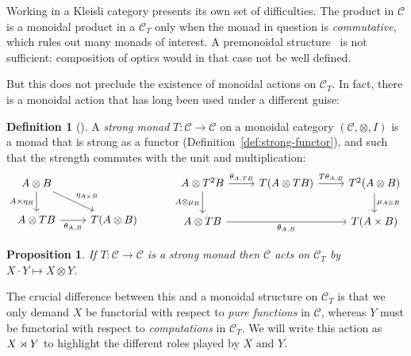 \documentclass[11pt,letterpaper]{article}
\theoremstyle{plain}
\newtheorem{proposition}[theorem]{Proposition}
\theoremstyle{definition}
\newtheorem{definition}[theorem]{Definition}
\newcommand{\C}{\mathscr{C}}
\begin{document}
Working in a Kleisli category presents its own set of difficulties. The product in $\C$ is a monoidal product in a $\C_T$ only when the monad in question is \emph{commutative}, which rules out many monads of interest. A premonoidal structure~\cite{PremonoidalCategories} is not sufficient: composition of optics would in that case not be well defined.

But this does not preclude the existence of monoidal actions on $\C_T$. In fact, there is a monoidal action that has long been used under a different guise:

\begin{definition}[{\cite{NotionsOfComputationAndMonads}}]
A \emph{strong monad} $T : \C \to \C$ on a monoidal category $(\C, \otimes, I)$ is a monad that is strong as a functor (Definition~\ref{def:strong-functor}), and such that the strength commutes with the unit and multiplication:
\[
  \begin{tikzcd}
    A \otimes B \ar[d, swap, "A \times \eta_B"] \ar[dr, "\eta_{A \times B}"] & \\
    A \otimes TB \ar[r, swap, "\theta_{A, B}"] & T(A \otimes B)
  \end{tikzcd} \hspace{1cm}
  \begin{tikzcd}
    A \otimes T^2 B \ar[r, "\theta_{A, TB}"] \ar[d, swap, "A \otimes \mu_B"] & T(A \otimes TB) \ar[r, "T\theta_{A, B}"] & T^2(A \otimes B) \ar[d, "\mu_{A \otimes B}"] \\
    A \otimes TB \ar[rr, swap, "\theta_{A, B}"] & & T(A \times B)
  \end{tikzcd}
\]
\end{definition}

\begin{proposition}
If $T : \C \to \C$ is a strong monad then $\C$ acts on $\C_T$ by $X \cdot Y \mapsto X \otimes Y$.
\end{proposition}

The crucial difference between this and a monoidal structure on $\C_T$ is that we only demand $X$ be functorial with respect to \emph{pure functions} in $\C$, whereas $Y$ must be functorial with respect to \emph{computations} in $\C_T$. We will write this action as $X \rtimes Y$ to highlight the different roles played by $X$ and $Y$.
\end{document}
